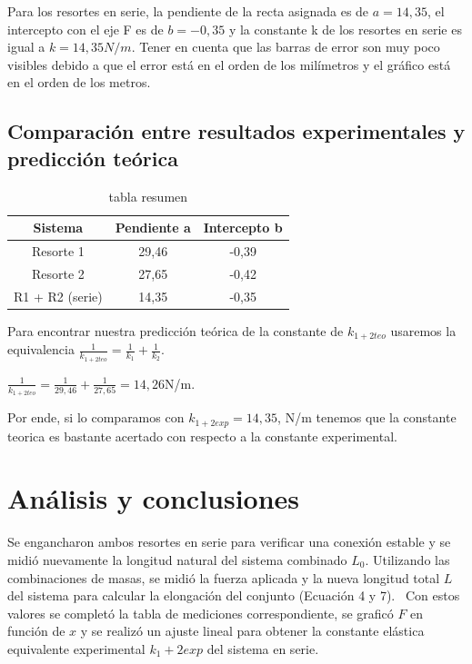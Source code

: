 \documentclass[12pt,a4paper]{article}
\begin{document}
Para los resortes en serie, la pendiente de la recta asignada es de $a=14,35$, el intercepto con el eje F es de $b=-0,35$ y la constante k de los resortes en serie es igual a $k=14,35 N/m$.
Tener en cuenta que las barras de error son muy poco visibles debido a que el error está en el orden de los milímetros y el gráfico está en el orden de los metros.

\subsection{Comparación entre resultados experimentales y predicción teórica}

    \begin{table}[H]
    \centering
        \caption{tabla resumen}
        \label{tab:tabla4}
        \begin{tabular}{c c c}
        \toprule
            Sistema & Pendiente a & Intercepto b\\
        \midrule
            Resorte 1 & 29,46 & -0,39 \\
            Resorte 2 & 27,65 & -0,42 \\
            R1 + R2 (serie) & 14,35 & -0,35 \\
        \bottomrule
        \end{tabular}
    \end{table}

Para encontrar nuestra predicción teórica de la constante de $k_{1+2 teo}$ usaremos la equivalencia $\frac{1}{k_{1+2 teo}} = \frac{1}{k_1} + \frac{1}{k_2}$. 

$\frac{1}{k_{1+2 teo}} = \frac{1}{29,46} + \frac{1}{27,65} = 14,26$N/m.

Por ende, si lo comparamos con $k_{1+2 exp} = 14,35$, N/m tenemos que la constante teorica es bastante acertado con respecto a la constante experimental.


\section{Análisis y conclusiones}

Se engancharon ambos resortes en serie para verificar una conexión estable y se midió nuevamente la longitud natural del sistema combinado $L_0$. Utilizando las combinaciones de masas, se midió la fuerza aplicada y la nueva longitud total $L$ del sistema para calcular la elongación del conjunto (Ecuación 4 y 7).  
 Con estos valores se completó la tabla de mediciones correspondiente, se graficó $F$ en función de $x$ y se realizó un ajuste lineal para obtener la constante elástica equivalente experimental $k_1+2exp$ del sistema en serie.
\end{document}

